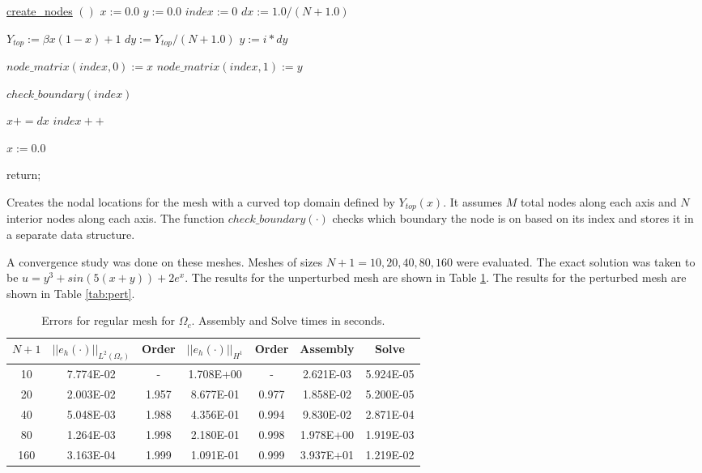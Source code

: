 \documentclass[a4paper, 12pt]{article}
\begin{document}
\begin{algorithm}[H]
  \underline{create\_nodes} $()$
  \BlankLine
  $x := 0.0$ \;
  $y := 0.0$ \;
  $index := 0$ \;
  $dx := 1.0 / (N+1.0)$\;
  {
    {
      $Y_{top} := \beta x (1-x) + 1$\;
      $dy := Y_{top} / (N+1.0)$\;
      $y := i * dy$\;

      $node\_matrix( index, 0) := x$\;
      $node\_matrix( index, 1) := y$\;

      $check\_boundary( index)$\;

      $x += dx$\;
      $index++$\;
    }
    $x := 0.0$\;
  }
  return;
  \caption{Creates the nodal locations for the mesh with 
           a curved top domain defined by $Y_{top}(x)$. 
           It assumes $M$ total nodes along each axis 
           and $N$ interior nodes along each axis.
           The function $check\_boundary(\cdot)$ checks
           which boundary the node is on based on its index
           and stores it in a separate data structure.}
  \label{al:create_nodes}
\end{algorithm}
\vspace{\baselineskip}


A convergence study was done on these meshes. 
Meshes of sizes $N+1=10, 20, 40, 80, 160$ were evaluated.
The exact solution was taken to be 
$u = y^3 + sin( 5 (x + y)) + 2e^x$.
The results for the unperturbed mesh are 
shown in Table \ref{tab:conv}. 
The results for the perturbed mesh are 
shown in Table \ref{tab:pert}. 


\begin{table}[!ht]
\caption{Errors for regular mesh for $\Omega_c$. Assembly and Solve times in seconds.}
\vspace{0.1in}
\centering
\begin{tabular}{|c|c|c|c|c|c|c|}
\hline
 $N+1$&  $||e_h(\cdot)||_{L^2(\Omega_c)}$ & Order & $||e_h(\cdot)||_{H^1}$ & Order & Assembly & Solve \\
 \hline
     10   & 7.774E-02 &  -      & 1.708E+00 &  -     & 2.621E-03 & 5.924E-05 \\
     20   & 2.003E-02 &  1.957  & 8.677E-01 &  0.977 & 1.858E-02 & 5.200E-05 \\
     40   & 5.048E-03 &  1.988  & 4.356E-01 &  0.994 & 9.830E-02 & 2.871E-04 \\
     80   & 1.264E-03 &  1.998  & 2.180E-01 &  0.998 & 1.978E+00 & 1.919E-03 \\
     160  & 3.163E-04 &  1.999  & 1.091E-01 &  0.999 & 3.937E+01 & 1.219E-02 \\
\hline
\end{tabular}
\label{tab:conv}
\end{table}
\end{document}
